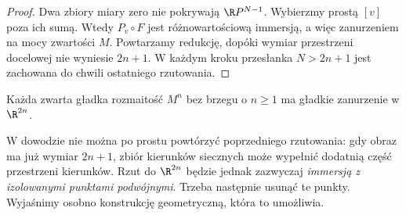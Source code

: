 \begin{proof}
Dwa zbiory miary zero nie pokrywają
$\R P^{N-1}$. Wybierzmy prostą $[v]$
poza ich sumą. Wtedy $P_v\circ F$ jest
różnowartościową immersją, a więc
zanurzeniem na mocy zwartości $M$.
Powtarzamy redukcję, dopóki wymiar
przestrzeni docelowej nie wyniesie
$2n+1$. W każdym kroku przesłanka
$N>2n+1$ jest zachowana do chwili
ostatniego rzutowania.
\end{proof}

\begin{twierdzenie}
\label{thm:whitney-mocne}
Każda zwarta gładka rozmaitość $M^n$ bez brzegu
o $n\geq1$ ma gładkie zanurzenie w $\R^{2n}$.
\end{twierdzenie}

W dowodzie nie można po prostu powtórzyć
poprzedniego rzutowania: gdy obraz ma już
wymiar $2n+1$, zbiór kierunków siecznych
może wypełnić dodatnią część przestrzeni
kierunków. Rzut do $\R^{2n}$ będzie jednak
zazwyczaj \emph{immersją z izolowanymi
punktami podwójnymi}. Trzeba następnie
usunąć te punkty. Wyjaśnimy osobno
konstrukcję geometryczną, która to umożliwia.

